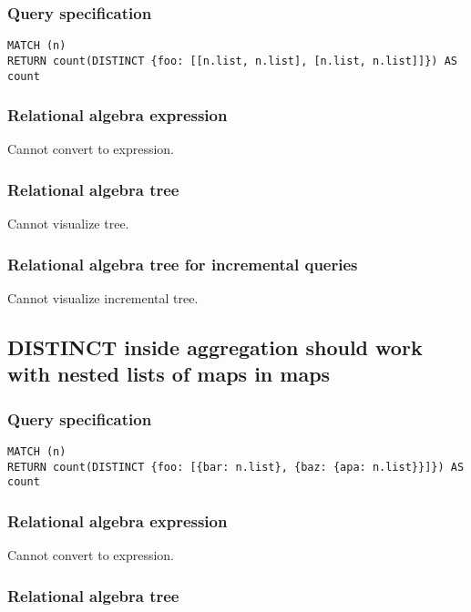 \subsubsection*{Query specification}

\begin{lstlisting}
MATCH (n)
RETURN count(DISTINCT {foo: [[n.list, n.list], [n.list, n.list]]}) AS count
\end{lstlisting}

\subsubsection*{Relational algebra expression}

Cannot convert to expression.

\subsubsection*{Relational algebra tree}

Cannot visualize tree.

\subsubsection*{Relational algebra tree for incremental queries}

Cannot visualize incremental tree.

\subsection{DISTINCT inside aggregation should work with nested lists of maps in maps}

\subsubsection*{Query specification}

\begin{lstlisting}
MATCH (n)
RETURN count(DISTINCT {foo: [{bar: n.list}, {baz: {apa: n.list}}]}) AS count
\end{lstlisting}

\subsubsection*{Relational algebra expression}

Cannot convert to expression.

\subsubsection*{Relational algebra tree}

